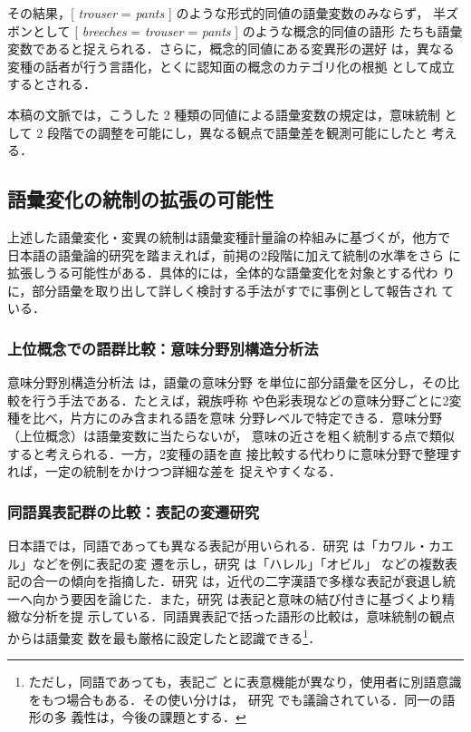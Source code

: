 \documentclass[submit]{ipsj}
\begin{document}
その結果，[ \emph{trouser} = \emph{pants} ] のような形式的同値の語彙変数のみならず，
半ズボンとして [ \emph{breeches} = \emph{trouser} = \emph{pants} ] のような概念的同値の語形
たちも語彙変数であると捉えられる．さらに，概念的同値にある変異形の選好
は，異なる変種の話者が行う言語化，とくに認知面の概念のカテゴリ化の根拠
として成立するとされる\cite{DePascale2019Tokenbased}．

本稿の文脈では，こうした 2 種類の同値による語彙変数の規定は，意味統制
として 2 段階での調整を可能にし，異なる観点で語彙差を観測可能にしたと
考える．
\subsection{語彙変化の統制の拡張の可能性\label{org7f3335f}}
\label{sec:org97ae29a}
上述した語彙変化・変異の統制は語彙変種計量論の枠組みに基づくが，他方で
日本語の語彙論的研究を踏まえれば，前掲の2段階に加えて統制の水準をさら
に拡張しうる可能性がある．具体的には，全体的な語彙変化を対象とする代わ
りに，部分語彙を取り出して詳しく検討する手法がすでに事例として報告され
ている．
\subsubsection{上位概念での語群比較：意味分野別構造分析法}
\label{sec:orgd0b5d78}
意味分野別構造分析法 \cite{tajima2000Goikenkyu} は，語彙の意味分野
を単位に部分語彙を区分し，その比較を行う手法である．たとえば，親族呼称
や色彩表現などの意味分野ごとに2変種を比べ，片方にのみ含まれる語を意味
分野レベルで特定できる．意味分野（上位概念）は語彙変数に当たらないが，
意味の近さを粗く統制する点で類似すると考えられる．一方，2変種の語を直
接比較する代わりに意味分野で整理すれば，一定の統制をかけつつ詳細な差を
捉えやすくなる．
\subsubsection{同語異表記群の比較：表記の変遷研究}
\label{sec:orge6e0a51}
日本語では，同語であっても異なる表記が用いられる．研究
\cite{takahashi2019Kindai} は「カワル・カエル」などを例に表記の変
遷を示し，研究 \cite{takahashi2016Kindai} は「ハレル」「オビル」
などの複数表記の合一の傾向を指摘した．研究
\cite{mabuchi2016Kindai} は，近代の二字漢語で多様な表記が衰退し統
一へ向かう要因を論じた．また，研究 \cite{takahashi2016Kindai,takahashi2019Kindai} は表記と意味の結び付きに基づくより精緻な分析を提
示している．同語異表記で括った語形の比較は，意味統制の観点からは語彙変
数を最も厳格に設定したと認識できる\footnote{ただし，同語であっても，表記ご
とに表意機能が異なり，使用者に別語意識をもつ場合もある．その使い分けは，
研究 \cite{takahashi2025Tango} でも議論されている．同一の語形の多
義性は，今後の課題とする．}．
\end{document}
